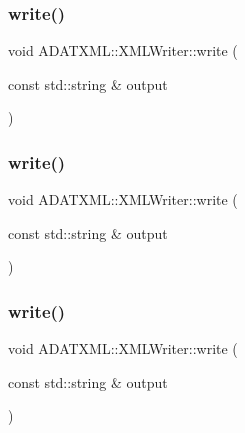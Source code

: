 \subsubsection{\texorpdfstring{write()}{write()}\hspace{0.1cm}{\footnotesize\ttfamily [1/30]}}
{\footnotesize\ttfamily void A\+D\+A\+T\+X\+M\+L\+::\+X\+M\+L\+Writer\+::write (\begin{DoxyParamCaption}\item[{const std\+::string \&}]{output }\end{DoxyParamCaption})}

\mbox{\label{classADATXML_1_1XMLWriter_a82f1a99241ecd26ea2bd7f3d87364ed7}} 
\subsubsection{\texorpdfstring{write()}{write()}\hspace{0.1cm}{\footnotesize\ttfamily [2/30]}}
{\footnotesize\ttfamily void A\+D\+A\+T\+X\+M\+L\+::\+X\+M\+L\+Writer\+::write (\begin{DoxyParamCaption}\item[{const std\+::string \&}]{output }\end{DoxyParamCaption})}

\mbox{\label{classADATXML_1_1XMLWriter_a82f1a99241ecd26ea2bd7f3d87364ed7}} 
\subsubsection{\texorpdfstring{write()}{write()}\hspace{0.1cm}{\footnotesize\ttfamily [3/30]}}
{\footnotesize\ttfamily void A\+D\+A\+T\+X\+M\+L\+::\+X\+M\+L\+Writer\+::write (\begin{DoxyParamCaption}\item[{const std\+::string \&}]{output }\end{DoxyParamCaption})}

